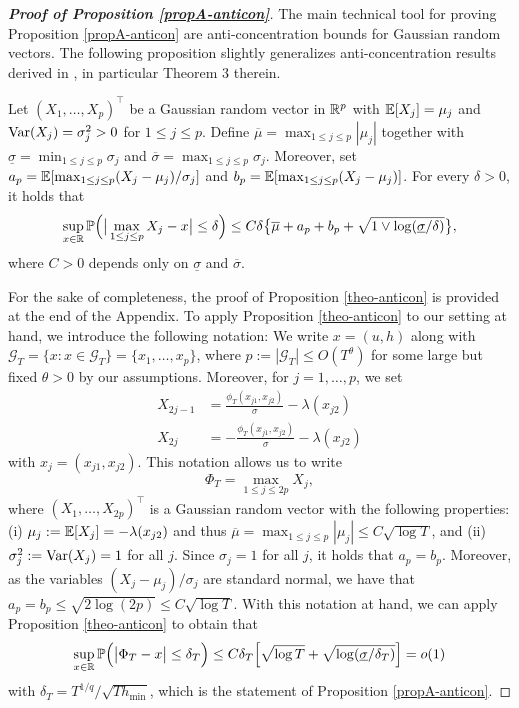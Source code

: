 \begin{proof}[\textnormal{\textbf{Proof of Proposition \ref{propA-anticon}}}] 
The main technical tool for proving Proposition \ref{propA-anticon} are anti-concentration bounds for Gaussian random vectors. The following proposition slightly generalizes anti-concentration results derived in \cite{Chernozhukov2015}, in particular Theorem 3 therein. 
\begin{propA}\label{theo-anticon}
Let $(X_1,\ldots,X_p)^\top$ be a Gaussian random vector in $\mathbb{R}^p$ with $\mathbb{E}[X_j] = \mu_j$ and $\textnormal{Var}(X_j) = \sigma_j^2 > 0$ for $1 \le j \le p$. Define $\overline{\mu} = \max_{1 \le j \le p} |\mu_j|$ together with $\underline{\sigma} = \min_{1 \le j \le p} \sigma_j$ and $\overline{\sigma} = \max_{1 \le j \le p} \sigma_j$. Moreover, set $a_p = \mathbb{E}[ \max_{1 \le j \le p} (X_j-\mu_j)/\sigma_j ]$ and $b_p = \mathbb{E}[ \max_{1 \le j \le p} (X_j-\mu_j) ]$. For every $\delta > 0$, it holds that
\[ \sup_{x \in \mathbb{R}} \mathbb{P} \Big( \big| \max_{1 \le j \le p} X_j - x \big| \le \delta \Big) \le C \delta \big\{ \overline{\mu} + a_p + b_p + \sqrt{1 \vee \log(\underline{\sigma}/\delta)} \big\}, \]
where $C > 0$ depends only on $\underline{\sigma}$ and $\overline{\sigma}$. 
\end{propA} 
For the sake of completeness, the proof of Proposition \ref{theo-anticon} is provided at the end of the Appendix. To apply Proposition \ref{theo-anticon} to our setting at hand, we introduce the following notation: We write $x = (u,h)$ along with $\mathcal{G}_T = \{ x : x \in \mathcal{G}_T \} = \{x_1,\ldots,x_p\}$, where $p := |\mathcal{G}_T| \le O(T^\theta)$ for some large but fixed $\theta > 0$ by our assumptions. Moreover, for $j = 1,\ldots,p$, we set 
\begin{align*}
X_{2j-1} & = \frac{\phi_T(x_{j1},x_{j2})}{\sigma} - \lambda(x_{j2}) \\
X_{2j} & = -\frac{\phi_T(x_{j1},x_{j2})}{\sigma} - \lambda(x_{j2}) 
\end{align*}
with $x_j = (x_{j1},x_{j2})$. This notation allows us to write
\[ \Phi_T = \max_{1 \le j \le 2p} X_j, \]
where $(X_1,\ldots,X_{2p})^\top$ is a Gaussian random vector with the following properties: (i) $\mu_j := \mathbb{E}[X_j] = - \lambda(x_{j2})$ and thus $\overline{\mu} = \max_{1 \le j \le p} |\mu_j| \le C \sqrt{\log T}$, and (ii) $\sigma_j^2 := \textnormal{Var}(X_j) = 1$ for all $j$. Since $\sigma_j = 1$ for all $j$, it holds that $a_p = b_p$. Moreover, as the variables $(X_j - \mu_j)/\sigma_j$ are standard normal, we have that $a_p = b_p \le \sqrt{2 \log (2p)} \le C \sqrt{\log T}$. With this notation at hand, we can apply Proposition \ref{theo-anticon} to obtain that 
\[ \sup_{x \in \mathbb{R}} \mathbb{P} \Big( \big| \Phi_T - x \big| \le \delta_T \Big) \le C \delta_T \Big[ \sqrt{\log T} + \sqrt{ \log(\underline{\sigma}/\delta_T) } \Big] = o(1) \]
with $\delta_T = T^{1/q} / \sqrt{T h_{\min}}$, which is the statement of Proposition \ref{propA-anticon}.
\end{proof}




